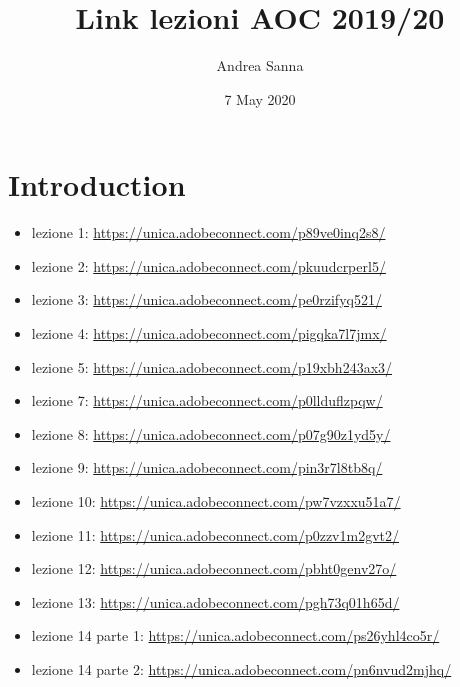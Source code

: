 \documentclass{article}
\title{Link lezioni AOC 2019/20}
\author{Andrea Sanna}
\date{7 May 2020}
\begin{document}
\maketitle

\section{Introduction}
\begin{itemize}
\item lezione 1: \url{https://unica.adobeconnect.com/p89ve0inq2s8/}\\
\item lezione 2: \url{https://unica.adobeconnect.com/pkuudcrperl5/}\\
\item lezione 3: \url{https://unica.adobeconnect.com/pe0rzifyq521/}\\
\item lezione 4: \url{https://unica.adobeconnect.com/pigqka7l7jmx/}\\
\item lezione 5: \url{https://unica.adobeconnect.com/p19xbh243ax3/}\\
\item lezione 7: \url{https://unica.adobeconnect.com/p0llduflzpqw/}\\
\item lezione 8: \url{https://unica.adobeconnect.com/p07g90z1yd5y/}\\
\item lezione 9: \url{https://unica.adobeconnect.com/pin3r7l8tb8q/}\\
\item lezione 10: \url{https://unica.adobeconnect.com/pw7vzxxu51a7/}\\
\item lezione 11: \url{https://unica.adobeconnect.com/p0zzv1m2gvt2/}\\
\item lezione 12: \url{https://unica.adobeconnect.com/pbht0genv27o/}\\
\item lezione 13: \url{https://unica.adobeconnect.com/pgh73q01h65d/}\\
\item lezione 14 parte 1: \url{https://unica.adobeconnect.com/ps26yhl4co5r/}\\
\item lezione 14 parte 2: \url{https://unica.adobeconnect.com/pn6nvud2mjhq/}\\
\end{itemize}
\end{document}
